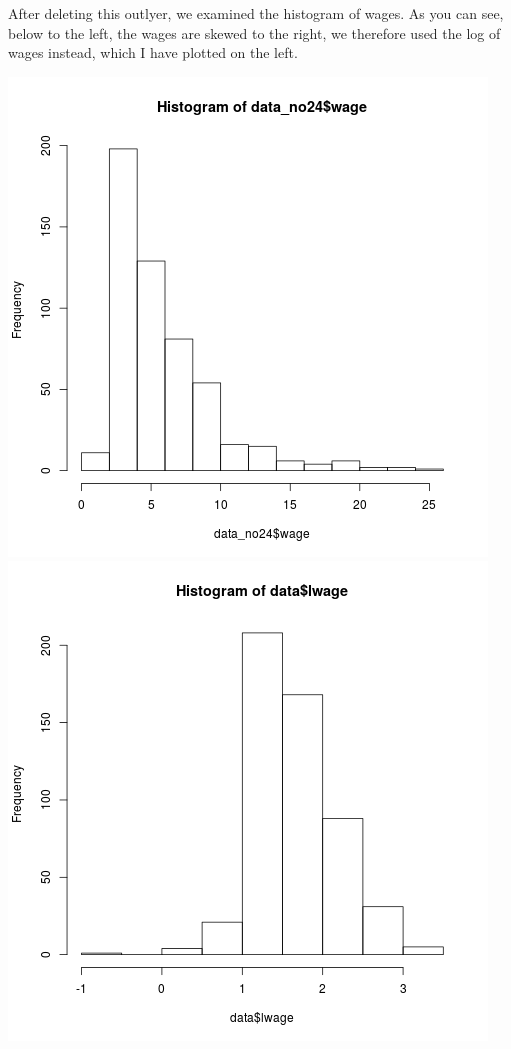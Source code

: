 \documentclass[12pt,a4paper,twoside]{article}
\begin{document}
After deleting this outlyer, we examined the histogram of wages. As you can see, below to the left, the wages are skewed to the right, we therefore used the log of wages instead, which I have plotted on the left.
\begin{center}
\includegraphics[scale=.2]{plot2.png}
\includegraphics[scale=.2]{plot1.png}
\end{center}
\end{document}
